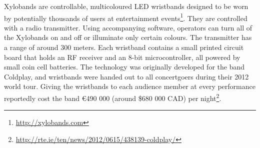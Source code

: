 Xylobands are controllable, multicoloured LED wristbands designed to be worn by potentially thousands of users at entertainment events\footnote{\url{http://xylobands.com}}. They are controlled with a radio transmitter. Using accompanying software, operators can turn all of the Xylobands on and off or illuminate only certain colours. The transmitter has a range of around 300 meters. Each wristband contains a small printed circuit board that holds an RF receiver and an 8-bit microcontroller, all powered by small coin cell batteries. The technology was originally developed for the band Coldplay, and wristbands were handed out to all concertgoers during their 2012 world tour. Giving the wristbands to each audience member at every performance reportedly cost the band \euro{}490 000 (around \$680 000 CAD) per night\footnote{\url{http://rte.ie/ten/news/2012/0615/438139-coldplay/}}.